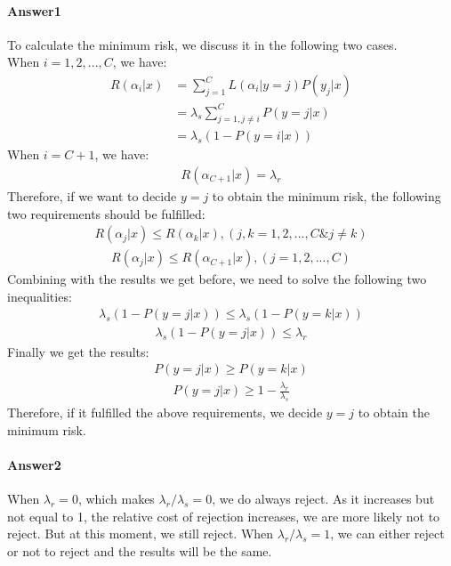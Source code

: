 \documentclass[paper=a4, fontsize=11pt]{scrartcl} %
\numberwithin{equation}{section} %
\numberwithin{figure}{section} %
\numberwithin{table}{section} %
\begin{document}
\paragraph{\textbf{Answer1}}
To calculate the minimum risk, we discuss it in the following two cases.
\\ When $i=1,2,...,C$, we have:
\begin{align*}
R\left ( \alpha _{i}|x \right )
&=\sum_{j=1}^{C}L\left ( \alpha _{i}|y=j \right )P\left ( y_{j}|x \right )
\\&=\lambda _{s}\sum_{j=1,j\neq i}^{C}P\left ( y=j|x \right )
\\&=\lambda _{s}\left ( 1-P\left ( y=i|x \right ) \right )
\end{align*}
When $i=C+1$, we have:
\begin{align*}
R\left ( \alpha _{C+1}|x \right )=\lambda _{r}
\end{align*}
Therefore, if we want to decide $y=j$ to obtain the minimum risk, the following two requirements should be fulfilled:
\begin{align*}
R\left ( \alpha _{j}|x \right )\leq R\left ( \alpha _{k}|x \right ),\left ( j,k=1,2,...,C \& j\neq k \right )
\end{align*}
\begin{align*}
R\left ( \alpha _{j}|x \right )\leq R\left ( \alpha _{C+1}|x \right ),\left ( j=1,2,...,C \right )
\end{align*}
Combining with the results we get before, we need to solve the following two inequalities:
\begin{align*}
\lambda _{s}\left ( 1-P\left ( y=j|x \right ) \right )\leq \lambda _{s}\left ( 1-P\left ( y=k|x \right ) \right )
\end{align*}
\begin{align*}
\lambda _{s}\left ( 1-P\left ( y=j|x \right ) \right )\leq \lambda _{r}
\end{align*}
Finally we get the results:
\begin{align*}
P\left ( y=j|x \right )\geq P\left ( y=k|x \right )
\end{align*}
\begin{align*}
P\left ( y=j|x \right )\geq 1-\frac{\lambda_{r} }{\lambda_{s} }
\end{align*}
Therefore, if it fulfilled the above requirements, we decide $y=j$ to obtain the minimum risk.

\paragraph{\textbf{Answer2}}
When $\lambda _{r}=0$, which makes $\lambda _{r}/\lambda _{s}=0$, we do always reject. As it increases but not equal to 1, the relative cost of rejection increases, we are more likely not to reject. But at this moment, we still reject. When $\lambda _{r}/\lambda _{s}=1$, we can either reject or not to reject and the results will be the same.
\end{document}
